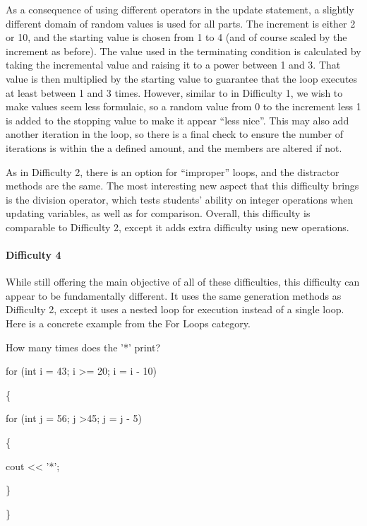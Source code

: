 \documentclass{article}
\begin{document}
As a consequence of using different operators in the update statement, a slightly different domain of random values is used for all parts. The increment is either 2 or 10, and the starting value 
is chosen from 1 to 4 (and of course scaled by the increment as before). The value used in the terminating condition is calculated by taking the incremental value and raising it to a power 
between 1 and 3. That value is then multiplied by the starting value to guarantee that the loop executes at least between 1 and 3 times. However, similar to in Difficulty 1, we wish to make
values seem less formulaic, so a random value from 0 to the increment less 1 is added to the stopping value to make it appear ``less nice''. This may also add another iteration in the loop,
so there is a final check to ensure the number of iterations is within the a defined amount, and the members are altered if not. 

As in Difficulty 2, there is an option for ``improper'' loops, and the distractor methods are the same. The most interesting new aspect that this difficulty brings is the division operator, which tests students' ability on integer operations
when updating variables, as well as for comparison. Overall, this difficulty is comparable to Difficulty 2, except it adds extra difficulty using new operations. 

\paragraph{Difficulty 4} \hfill \par
While still offering the main objective of all of these difficulties, this difficulty can appear to be fundamentally different. It uses the same generation methods as Difficulty 2, except it uses 
a nested loop for execution instead of a single loop. Here is a concrete example from the For Loops category.

\hfill \par
How many times does the '*' print? \par
for (int i = 43; i \textgreater= 20; i = i - 10) \par
\{ \par
\indent\indent for (int j = 56; j \textgreater 45; j = j - 5) \par
\indent\indent \{ \par
\indent\indent \indent\indent cout \textless\textless{} '*'; \par
\indent\indent \} \par
\} \par
\end{document}

